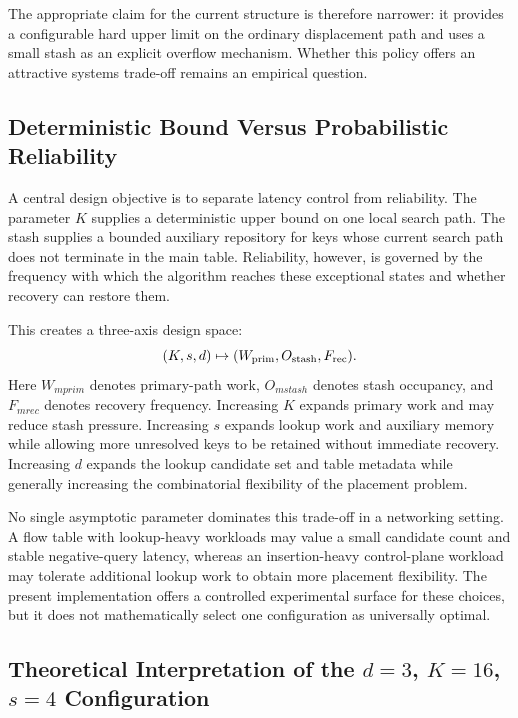 \documentclass[conference]{IEEEtran}
\begin{document}
The appropriate claim for the current structure is therefore narrower: it provides a configurable hard upper limit on the ordinary displacement path and uses a small stash as an explicit overflow mechanism. Whether this policy offers an attractive systems trade-off remains an empirical question.

\subsection{Deterministic Bound Versus Probabilistic Reliability}

A central design objective is to separate latency control from reliability. The parameter $K$ supplies a deterministic upper bound on one local search path. The stash supplies a bounded auxiliary repository for keys whose current search path does not terminate in the main table. Reliability, however, is governed by the frequency with which the algorithm reaches these exceptional states and whether recovery can restore them.

This creates a three-axis design space:
\begin{equation}
    (K,s,d) \mapsto (W_{\rm prim},O_{\rm stash},F_{\rm rec}).
    \label{eq:three-axis}
\end{equation}
Here $W_{
m prim}$ denotes primary-path work, $O_{
m stash}$ denotes stash occupancy, and $F_{
m rec}$ denotes recovery frequency. Increasing $K$ expands primary work and may reduce stash pressure. Increasing $s$ expands lookup work and auxiliary memory while allowing more unresolved keys to be retained without immediate recovery. Increasing $d$ expands the lookup candidate set and table metadata while generally increasing the combinatorial flexibility of the placement problem.

No single asymptotic parameter dominates this trade-off in a networking setting. A flow table with lookup-heavy workloads may value a small candidate count and stable negative-query latency, whereas an insertion-heavy control-plane workload may tolerate additional lookup work to obtain more placement flexibility. The present implementation offers a controlled experimental surface for these choices, but it does not mathematically select one configuration as universally optimal.

\subsection{Theoretical Interpretation of the $d=3$, $K=16$, $s=4$ Configuration}
\end{document}
